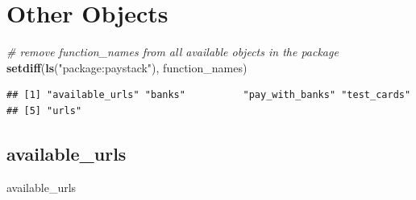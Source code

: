 \documentclass[]{book}
\newenvironment{Shaded}{\begin{snugshade}}{\end{snugshade}}
\newcommand{\KeywordTok}[1]{\textcolor[rgb]{0.13,0.29,0.53}{\textbf{#1}}}
\newcommand{\StringTok}[1]{\textcolor[rgb]{0.31,0.60,0.02}{#1}}
\newcommand{\CommentTok}[1]{\textcolor[rgb]{0.56,0.35,0.01}{\textit{#1}}}
\newcommand{\NormalTok}[1]{#1}
\begin{document}
\section{Other Objects}\label{other-objects}

\begin{Shaded}
\begin{Highlighting}[]
\CommentTok{# remove function_names from all available objects in the package}
\KeywordTok{setdiff}\NormalTok{(}\KeywordTok{ls}\NormalTok{(}\StringTok{"package:paystack"}\NormalTok{), function_names)}
\end{Highlighting}
\end{Shaded}

\begin{verbatim}
## [1] "available_urls" "banks"          "pay_with_banks" "test_cards"    
## [5] "urls"
\end{verbatim}

\subsection{available\_urls}\label{available_urls}

\begin{Shaded}
\begin{Highlighting}[]
\NormalTok{available_urls}
\end{Highlighting}
\end{Shaded}
\end{document}
